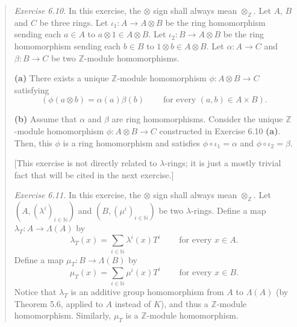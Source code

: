 \documentclass[numbers=enddot,12pt,final,onecolumn,notitlepage]{scrartcl}%
\begin{document}
\begin{quotation}
\textit{Exercise 6.10.} In this exercise, the $\otimes$ sign shall always mean
$\otimes_{\mathbb{Z}}$. Let $A$, $B$ and $C$ be three rings. Let $\iota
_{1}:A\rightarrow A\otimes B$ be the ring homomorphism sending each $a\in A$
to $a\otimes1\in A\otimes B$. Let $\iota_{2}:B\rightarrow A\otimes B$ be the
ring homomorphism sending each $b\in B$ to $1\otimes b\in A\otimes B$. Let
$\alpha:A\rightarrow C$ and $\beta:B\rightarrow C$ be two $\mathbb{Z}$-module homomorphisms.

\textbf{(a)} There exists a unique $\mathbb{Z}$-module homomorphism
$\phi:A\otimes B\rightarrow C$ satisfying%
\[
\left(  \phi\left(  a\otimes b\right)  =\alpha\left(  a\right)  \beta\left(
b\right)  \ \ \ \ \ \ \ \ \ \ \text{for every }\left(  a,b\right)  \in A\times
B\right)  .
\]


\textbf{(b)} Assume that $\alpha$ and $\beta$ are ring homomorphisms. Consider
the unique $\mathbb{Z}$-module homomorphism $\phi:A\otimes B\rightarrow C$
constructed in Exercise 6.10 \textbf{(a)}. Then, this $\phi$ is a ring
homomorphism and satisfies $\phi\circ\iota_{1}=\alpha$ and $\phi\circ\iota
_{2}=\beta$.

[This exercise is not directly related to $\lambda$-rings; it is just a mostly
trivial fact that will be cited in the next exercise.]

\textit{Exercise 6.11.} In this exercise, the $\otimes$ sign shall always mean
$\otimes_{\mathbb{Z}}$. Let $\left(  A,\left(  \lambda^{i}\right)
_{i\in\mathbb{N}}\right)  $ and $\left(  B,\left(  \mu^{i}\right)
_{i\in\mathbb{N}}\right)  $ be two $\lambda$-rings. Define a map $\lambda
_{T}:A\rightarrow\Lambda\left(  A\right)  $ by
\[
\lambda_{T}\left(  x\right)  =\sum\limits_{i\in\mathbb{N}}\lambda^{i}\left(
x\right)  T^{i}\ \ \ \ \ \ \ \ \ \ \text{for every }x\in A.
\]
Define a map $\mu_{T}:B\rightarrow\Lambda\left(  B\right)  $ by%
\[
\mu_{T}\left(  x\right)  =\sum\limits_{i\in\mathbb{N}}\mu^{i}\left(  x\right)
T^{i}\ \ \ \ \ \ \ \ \ \ \text{for every }x\in B.
\]
Notice that $\lambda_{T}$ is an additive group homomorphism from $A$ to
$\Lambda\left(  A\right)  $ (by Theorem 5.6, applied to $A$ instead of $K$),
and thus a $\mathbb{Z}$-module homomorphism. Similarly, $\mu_{T}$ is a
$\mathbb{Z}$-module homomorphism.


\end{quotation}
\end{document}
